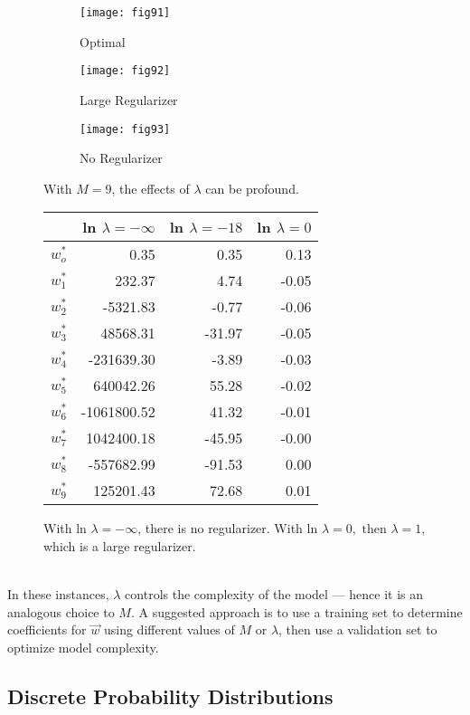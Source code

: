 \documentclass[11pt]{article} %
\begin{document}
\begin{figure}
\centering
	\begin{subfigure}[t]{0.3\textwidth}
		\texttt{[image: fig91]}
	\caption{Optimal}
	\end{subfigure}
	\begin{subfigure}[t]{0.3\textwidth}
		\texttt{[image: fig92]}
	\caption{Large Regularizer}
	\end{subfigure}
	\begin{subfigure}[t]{0.3\textwidth}
		\texttt{[image: fig93]}
	\caption{No Regularizer}
	\end{subfigure}
	\caption{With $M=9$, the effects of $\lambda$ can be profound.}
\end{figure}
\begin{figure}
\centering
\begin{tabular}{r | r r r}
& ln $\lambda = - \infty$ & ln $\lambda = -18$ & ln $\lambda = 0$ \\
\hline
$w_o^{\ast}$ & 0.35 & 0.35 & 0.13 \\
$w_1^{\ast}$ & 232.37 & 4.74 & -0.05 \\
$w_2^{\ast}$ &  -5321.83 & -0.77 & -0.06 \\
$w_3^{\ast}$ & 48568.31 & -31.97 & -0.05 \\
$w_4^{\ast}$ & -231639.30 & -3.89 & -0.03 \\
$w_5^{\ast}$ & 640042.26 & 55.28 & -0.02 \\
$w_6^{\ast}$ & -1061800.52 & 41.32 & -0.01 \\
$w_7^{\ast}$ & 1042400.18 & -45.95 & -0.00 \\
$w_8^{\ast}$ & -557682.99 & -91.53 & 0.00 \\
$w_9^{\ast}$ & 125201.43 & 72.68 & 0.01
\end{tabular}
\caption{With ln $\lambda = - \infty$, there is no regularizer. With ln $\lambda = 0,\text{ then }\lambda = 1$, which is a large regularizer.}
\end{figure}
~\\
In these instances, $\lambda$ controls the complexity of the model --- hence it is an analogous choice to $M$. A suggested approach is to use a training set to determine coefficients for $\vec{w}$ using different values of $M$ or $\lambda$, then use a validation set to optimize model complexity.

\subsection{Discrete Probability Distributions}
\end{document}
